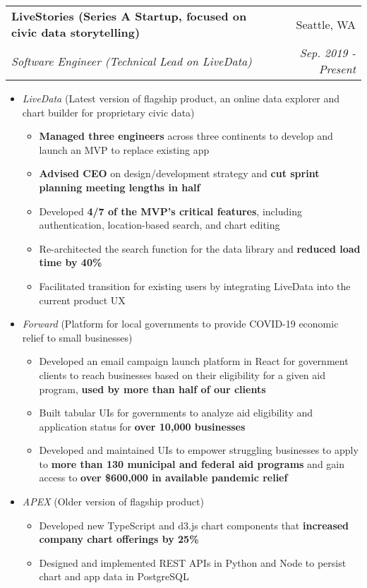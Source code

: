 \documentclass[letterpaper,11pt]{article}
\makeatletter
\newcommand{\resumeItemNoTitleTopPadding}[1]{\vspace{0.5pt} \item\small #1 \vspace{-2pt}}
\newcommand{\resumeItemNoTitle}[1]{\item\small #1 \vspace{-2pt}}
\newcommand{\resumeSubheading}[4]{
  \vspace{-1pt}\item
    \begin{tabular*}{0.97\textwidth}[t]{l@{\extracolsep{\fill}}r}
      \textbf{#1} & #2 \\
      \textit{\small#3} & \textit{\small #4} \\
    \end{tabular*}\vspace{-5pt}
}
\newcommand{\resumeItemListStart}{\begin{itemize}[leftmargin=*]}
\newcommand{\resumeListEnd}{\end{itemize}}
\makeatother
\begin{document}
    \resumeSubheading
      {LiveStories (Series A Startup, focused on civic data storytelling)}{Seattle, WA}
      {Software Engineer (Technical Lead on \textup{LiveData})}{Sep. 2019 - Present}
      \resumeItemListStart
        \resumeItemNoTitle {\textit{LiveData} (Latest version of flagship product, an  online data explorer and chart builder for proprietary civic data)}
        \resumeItemListStart
          \resumeItemNoTitle {\textbf{Managed three engineers} across three continents to develop and launch an MVP to replace existing app}
          \resumeItemNoTitle{\textbf{Advised CEO} on design/development strategy and \textbf{cut sprint planning meeting lengths in half}}
          \resumeItemNoTitle {Developed \textbf{4/7 of the MVP's critical features}, including authentication, location-based search, and chart editing} \resumeItemNoTitle {Re-architected the search function for the data library and \textbf{reduced load time by 40\%}}
          \resumeItemNoTitle {Facilitated transition for existing users by integrating LiveData into the current product UX}
        \end{itemize}
        \resumeItemNoTitleTopPadding {\textit{Forward} (Platform for local governments to provide COVID-19 economic relief to small businesses)}
        \resumeItemListStart
          \resumeItemNoTitle {Developed an email campaign launch platform in React for government clients to reach businesses based on their eligibility for a given aid program, \textbf{used by more than half of our clients}}
          \resumeItemNoTitle {Built tabular UIs for governments to analyze aid eligibility and application status for \textbf{over 10,000 businesses}} \resumeItemNoTitle {Developed and maintained UIs to empower struggling businesses to apply to \textbf{more than 130 municipal and federal aid programs} and gain access to \textbf{over \$600,000 in available pandemic relief}}
        \end{itemize}
        \resumeItemNoTitleTopPadding {\textit{APEX} (Older version of flagship product)}
        \resumeItemListStart
          \resumeItemNoTitle {Developed new TypeScript and d3.js chart components that \textbf{increased company chart offerings by 25\%}}
          \resumeItemNoTitle {Designed and implemented REST APIs in Python and Node to persist chart and app data in PostgreSQL}
        \end{itemize}
      \resumeListEnd
      
\end{document}
